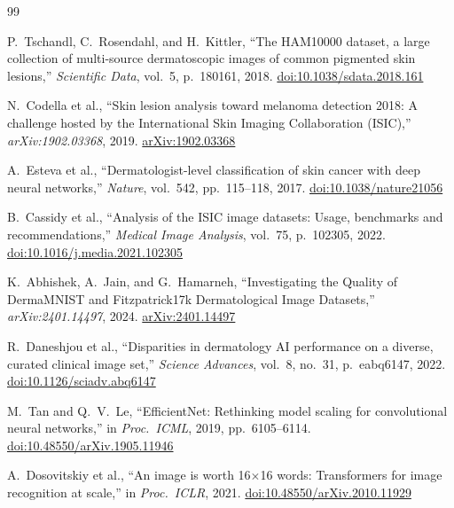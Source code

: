 \documentclass[10pt,twocolumn]{article}
\begin{document}

\begin{thebibliography}{99}

P.~Tschandl, C.~Rosendahl, and H.~Kittler,
``The HAM10000 dataset, a large collection of multi-source dermatoscopic images of common pigmented skin lesions,''
\textit{Scientific Data}, vol.~5, p.~180161, 2018.
\href{https://doi.org/10.1038/sdata.2018.161}{doi:10.1038/sdata.2018.161}

N.~Codella et al.,
``Skin lesion analysis toward melanoma detection 2018: A challenge hosted by the International Skin Imaging Collaboration (ISIC),''
\textit{arXiv:1902.03368}, 2019.
\href{https://arxiv.org/abs/1902.03368}{arXiv:1902.03368}

A.~Esteva et al.,
``Dermatologist-level classification of skin cancer with deep neural networks,''
\textit{Nature}, vol.~542, pp.~115--118, 2017.
\href{https://doi.org/10.1038/nature21056}{doi:10.1038/nature21056}

B.~Cassidy et al.,
``Analysis of the ISIC image datasets: Usage, benchmarks and recommendations,''
\textit{Medical Image Analysis}, vol.~75, p.~102305, 2022.
\href{https://doi.org/10.1016/j.media.2021.102305}{doi:10.1016/j.media.2021.102305}

K.~Abhishek, A.~Jain, and G.~Hamarneh,
``Investigating the Quality of DermaMNIST and Fitzpatrick17k Dermatological Image Datasets,''
\textit{arXiv:2401.14497}, 2024.
\href{https://arxiv.org/abs/2401.14497}{arXiv:2401.14497}

R.~Daneshjou et al.,
``Disparities in dermatology AI performance on a diverse, curated clinical image set,''
\textit{Science Advances}, vol.~8, no.~31, p.~eabq6147, 2022.
\href{https://doi.org/10.1126/sciadv.abq6147}{doi:10.1126/sciadv.abq6147}

M.~Tan and Q.~V.~Le,
``EfficientNet: Rethinking model scaling for convolutional neural networks,''
in \textit{Proc.\ ICML}, 2019, pp.~6105--6114.
\href{https://doi.org/10.48550/arXiv.1905.11946}{doi:10.48550/arXiv.1905.11946}

A.~Dosovitskiy et al.,
``An image is worth 16$\times$16 words: Transformers for image recognition at scale,''
in \textit{Proc.\ ICLR}, 2021.
\href{https://doi.org/10.48550/arXiv.2010.11929}{doi:10.48550/arXiv.2010.11929}


\end{thebibliography}
\end{document}
